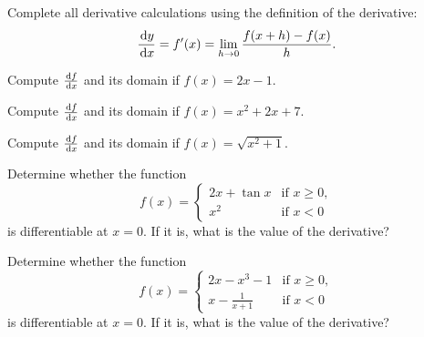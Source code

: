 \setcounter{chapter}{3}
\setcounter{section}{2}
\setcounter{theorem}{0}
\setcounter{equation}{0}


\begin{remark}
Complete all derivative calculations using the definition of the derivative:
\begin{equation*}
\frac{\mkern 2mu \mathrm{d} y}{\mkern 2mu \mathrm{d} x} = f'(x) = \lim_{h\to 0}\frac{f(x+h)-f(x)}{h}.
\end{equation*}
\end{remark}

\begin{example}
Compute $\frac{\mkern 2mu \mathrm{d} f}{\mkern 2mu \mathrm{d} x}$ and its domain if $f(x) = 2x-1$.
\end{example}

\newpage

\begin{example}
Compute $\frac{\mkern 2mu \mathrm{d} f}{\mkern 2mu \mathrm{d} x}$ and its domain if $f(x) = x^2+2x+7$.
\end{example}
\newpage

\begin{example}
Compute $\frac{\mkern 2mu \mathrm{d} f}{\mkern 2mu \mathrm{d} x}$ and its domain if $f(x) = \sqrt{x^2+1}$.
\end{example}
\newpage

\begin{example}
Determine whether the function
\begin{equation*}
f(x) = \begin{cases}
2x+\tan x & \text{if } x\ge 0,\\
x^{2} &\text{if } x<0
\end{cases}
\end{equation*}
is differentiable at $x=0$.
If it is, what is the value of the derivative?
\end{example}

\newpage

\begin{example}
Determine whether the function
\begin{equation*}
f(x) = \begin{cases}
2x-x^3-1 & \text{if } x\ge 0,\\
x-\frac{1}{x+1} &\text{if } x<0
\end{cases}
\end{equation*}
is differentiable at $x=0$.
If it is, what is the value of the derivative?
\end{example}

